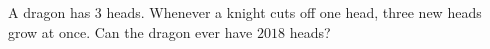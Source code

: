 A dragon has $3$ heads. Whenever a knight cuts off one head, three new heads grow at once. Can the dragon ever have $2018$ heads?

